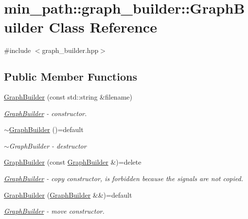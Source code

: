 \hypertarget{classmin__path_1_1graph__builder_1_1_graph_builder}{}\section{min\+\_\+path\+:\+:graph\+\_\+builder\+:\+:Graph\+Builder Class Reference}
\label{classmin__path_1_1graph__builder_1_1_graph_builder}


{\ttfamily \#include $<$graph\+\_\+builder.\+hpp$>$}

\subsection*{Public Member Functions}
\begin{DoxyCompactItemize}
\item 
\hyperlink{classmin__path_1_1graph__builder_1_1_graph_builder_af8e42b34ae946ec91a86daea07379bb4}{Graph\+Builder} (const std\+::string \&filename)
\begin{DoxyCompactList}\small\item\em \hyperlink{classmin__path_1_1graph__builder_1_1_graph_builder}{Graph\+Builder} -\/ constructor. \end{DoxyCompactList}\item 
\hyperlink{classmin__path_1_1graph__builder_1_1_graph_builder_a63770862e662bfa85ca917f2aa2085f7}{$\sim$\+Graph\+Builder} ()=default
\begin{DoxyCompactList}\small\item\em $\sim$\+Graph\+Builder -\/ destructor \end{DoxyCompactList}\item 
\hyperlink{classmin__path_1_1graph__builder_1_1_graph_builder_a616bc8b7bcebcd695066b1c77bff0d58}{Graph\+Builder} (const \hyperlink{classmin__path_1_1graph__builder_1_1_graph_builder}{Graph\+Builder} \&)=delete
\begin{DoxyCompactList}\small\item\em \hyperlink{classmin__path_1_1graph__builder_1_1_graph_builder}{Graph\+Builder} -\/ copy constructor, is forbidden because the signals are not copied. \end{DoxyCompactList}\item 
\hyperlink{classmin__path_1_1graph__builder_1_1_graph_builder_a63a7bf449c4341c57ac11292683fe4b5}{Graph\+Builder} (\hyperlink{classmin__path_1_1graph__builder_1_1_graph_builder}{Graph\+Builder} \&\&)=default
\begin{DoxyCompactList}\small\item\em \hyperlink{classmin__path_1_1graph__builder_1_1_graph_builder}{Graph\+Builder} -\/ move constructor. \end{DoxyCompactList}\item 

\end{DoxyCompactItemize}
